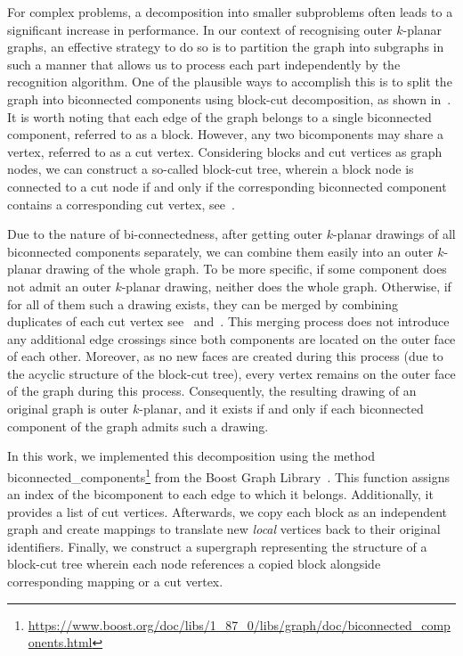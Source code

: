 For complex problems, a decomposition into smaller subproblems often leads to a significant increase in performance. In our context of recognising outer \(k\)-planar graphs, an effective strategy to do so is to partition the graph into subgraphs in such a manner that allows us to process each part independently by the recognition algorithm. One of the plausible ways to accomplish this is to split the graph into biconnected components using block-cut decomposition, as shown in~. It is worth noting that each edge of the graph belongs to a single biconnected component, referred to as a block. However, any two bicomponents may share a vertex, referred to as a cut vertex. Considering blocks and cut vertices as graph nodes, we can construct a so-called block-cut tree, wherein a block node is connected to a cut node if and only if the corresponding biconnected component contains a corresponding cut vertex, see~.

Due to the nature of bi-connectedness, after getting outer \(k\)-planar drawings of all biconnected components separately, we can combine them easily into an outer \(k\)-planar drawing of the whole graph. To be more specific, if some component does not admit an outer \(k\)-planar drawing, neither does the whole graph. Otherwise, if for all of them such a drawing exists, they can be merged by combining duplicates of each cut vertex see~ and~. This merging process does not introduce any additional edge crossings since both components are located on the outer face of each other. Moreover, as no new faces are created during this process (due to the acyclic structure of the block-cut tree), every vertex remains on the outer face of the graph during this process. Consequently, the resulting drawing of an original graph is outer \(k\)-planar, and it exists if and only if each biconnected component of the graph admits such a drawing.

In this work, we implemented this decomposition using the method \textsf{bi\-connec\-ted\_compo\-nents}\footnote{\url{https://www.boost.org/doc/libs/1_87_0/libs/graph/doc/biconnected_components.html}} from the Boost Graph Library~\cite{boost}. This function assigns an index of the bicomponent to each edge to which it belongs. Additionally, it provides a list of cut vertices. Afterwards, we copy each block as an independent graph and create mappings to translate new \emph{local} vertices back to their original identifiers. Finally, we construct a supergraph representing the structure of a block-cut tree wherein each node references a copied block alongside corresponding mapping or a cut vertex.

